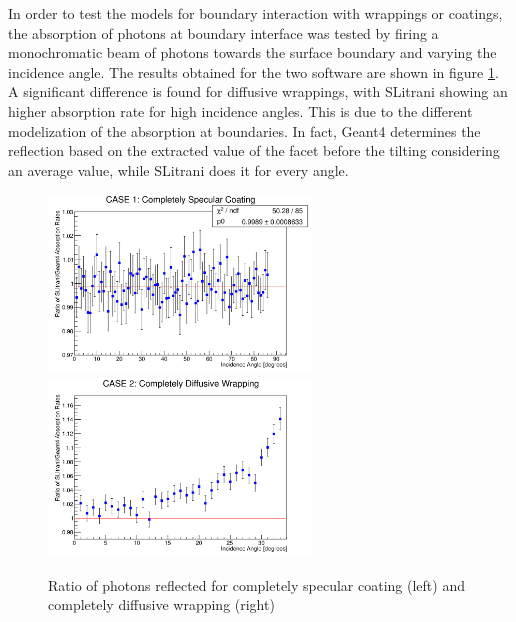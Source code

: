In order to test the models for boundary interaction with wrappings or coatings, the absorption of photons at boundary interface was tested by firing a monochromatic beam of photons towards the surface boundary and varying the incidence angle. The results obtained for the two software are shown in figure \ref{fig:surface}.
A significant difference is found for diffusive wrappings, with SLitrani showing an higher absorption rate for high incidence angles. This is due to the different modelization of the absorption  at boundaries. In fact, Geant4 determines the reflection based on the extracted value of the facet before the tilting considering an average value, while SLitrani does it for every angle.
\begin{figure}[htbp]
\begin{center}
\includegraphics[width=7cm]{../Pictures/Chapter_5/specular.png}
\includegraphics[width=7cm]{../Pictures/Chapter_5/diffusive.png}
\end{center}
\caption[Geant4 SLitrani specular and diffusive reflection]{Ratio of photons reflected for completely specular coating (left) and completely diffusive wrapping (right)}
\label{fig:surface}
\end{figure}

